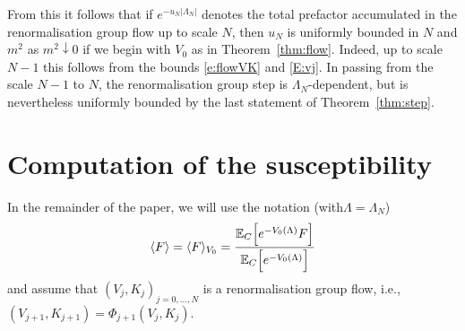 \documentclass[11pt]{amsart}
\numberwithin{equation}{section}
\numberwithin{theorem}{section}
\newcommand{\1}{{\bf 1}}
\begin{document}
From this it follows that if $e^{-u_{N}|\Lambda_N|}$ denotes the total
prefactor accumulated in the renormalisation group flow up to scale $N$,
then $u_{N}$ is uniformly bounded in $N$ and $m^2$ as $m^2\downarrow 0$ if
we begin with $V_0$ as in Theorem~\ref{thm:flow}.  Indeed, up to scale
$N-1$ this follows from the bounds \eqref{e:flowVK} and \eqref{E:vj}.
In passing from the scale $N-1$ to $N$, the renormalisation group step
is $\Lambda_N$-dependent, but is nevertheless uniformly bounded by the
last statement of Theorem~\ref{thm:step}.



\section{Computation of the susceptibility}
\label{sec:suscept}

In the remainder of the paper, we will use the notation (with$\Lambda = \Lambda_{N}$)
\begin{equation} \label{e:avgV0}
  \langle F \rangle = \langle F \rangle_{V_0} = \frac{\mathbb{E}_C\Bigl[{e^{-V_0(\Lambda)}F}\Bigr]}{\mathbb{E}_C\Bigl[{e^{-V_0(\Lambda)}}\Bigr]}
\end{equation}
and assume that $(V_j,K_j)_{j=0,\dots,N}$ is a renormalisation group flow, i.e., $(V_{j+1},K_{j+1})=\Phi_{j+1}(V_j,K_j)$.
\end{document}
